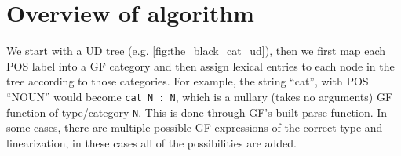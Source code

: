 


% 
% 
% 
% 

\section{Overview of algorithm}

We start with a UD tree (e.g. \autoref{fig:the_black_cat_ud}), then we first map each POS label into a GF category and then assign lexical entries to each node in the tree according to those categories. For example, the string ``cat'', with POS ``NOUN'' would become \lstinline|cat_N : N|, which is a nullary (takes no arguments) GF function of type/category \lstinline|N|. This is done through GF's built parse function. In some cases, there are multiple possible GF expressions of the correct type and linearization, in these cases all of the possibilities are added.

